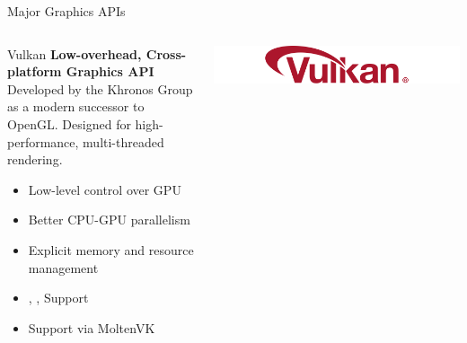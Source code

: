 \begin{frame}{Major Graphics APIs}
  \small
  \begin{columns}
    \begin{column}{0.7\textwidth}
      \begin{conceptbox}{Vulkan}
        \textbf{Low-overhead, Cross-platform Graphics API} \\
        Developed by the Khronos Group as a modern successor to OpenGL.
        Designed for high-performance, multi-threaded rendering.
        \begin{itemize}
          \item Low-level control over GPU
          \item Better CPU-GPU parallelism
          \item Explicit memory and resource management
          \item {}, ,  Support
          \item {} Support via MoltenVK
        \end{itemize}
      \end{conceptbox}
    \end{column}
    \begin{column}{0.3\textwidth}
      \hspace*{-0.7cm}
      \includegraphics[width=1.3\textwidth]{images/Vulkan_logo..png}
    \end{column}
  \end{columns}
\end{frame}

